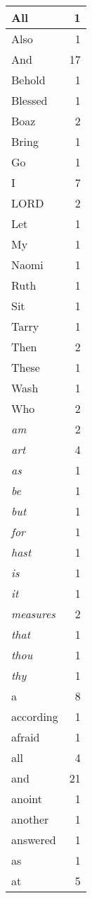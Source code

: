 \begin{center}
\begin{longtable}{l|r}
\hline \hline
\endlastfoot
All & 1 \\ \hline
Also & 1 \\ \hline
And & 17 \\ \hline
Behold & 1 \\ \hline
Blessed & 1 \\ \hline
Boaz & 2 \\ \hline
Bring & 1 \\ \hline
Go & 1 \\ \hline
I & 7 \\ \hline
LORD & 2 \\ \hline
Let & 1 \\ \hline
My & 1 \\ \hline
Naomi & 1 \\ \hline
Ruth & 1 \\ \hline
Sit & 1 \\ \hline
Tarry & 1 \\ \hline
Then & 2 \\ \hline
These & 1 \\ \hline
Wash & 1 \\ \hline
Who & 2 \\ \hline
\emph{am} & 2 \\ \hline
\emph{art} & 4 \\ \hline
\emph{as} & 1 \\ \hline
\emph{be} & 1 \\ \hline
\emph{but} & 1 \\ \hline
\emph{for} & 1 \\ \hline
\emph{hast} & 1 \\ \hline
\emph{is} & 1 \\ \hline
\emph{it} & 1 \\ \hline
\emph{measures} & 2 \\ \hline
\emph{that} & 1 \\ \hline
\emph{thou} & 1 \\ \hline
\emph{thy} & 1 \\ \hline
a & 8 \\ \hline
according & 1 \\ \hline
afraid & 1 \\ \hline
all & 4 \\ \hline
and & 21 \\ \hline
anoint & 1 \\ \hline
another & 1 \\ \hline
answered & 1 \\ \hline
as & 1 \\ \hline
at & 5 \\ \hline

\end{longtable}
\end{center}
